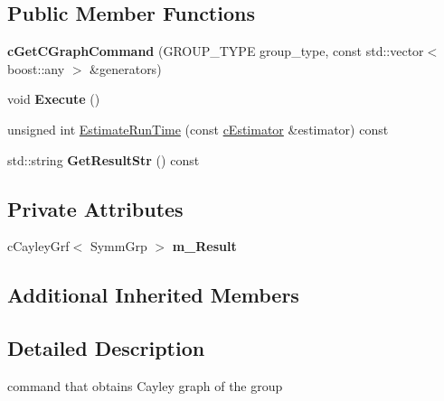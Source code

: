 \subsection*{Public Member Functions}
\begin{DoxyCompactItemize}
\item 
\hypertarget{classengine_1_1cGetCGraphCommand_a7fad17f3378da72ef8663f2587466bcc}{{\bfseries c\-Get\-C\-Graph\-Command} (G\-R\-O\-U\-P\-\_\-\-T\-Y\-P\-E group\-\_\-type, const std\-::vector$<$ boost\-::any $>$ \&generators)}\label{classengine_1_1cGetCGraphCommand_a7fad17f3378da72ef8663f2587466bcc}

\item 
\hypertarget{classengine_1_1cGetCGraphCommand_a94b83bc4b3103138411ec5bf1ccca84c}{void {\bfseries Execute} ()}\label{classengine_1_1cGetCGraphCommand_a94b83bc4b3103138411ec5bf1ccca84c}

\item 
unsigned int \hyperlink{classengine_1_1cGetCGraphCommand_a0a3d07c4f82227b7f0ffbcf01f7fcec2}{Estimate\-Run\-Time} (const \hyperlink{classengine_1_1cEstimator}{c\-Estimator} \&estimator) const 
\item 
\hypertarget{classengine_1_1cGetCGraphCommand_a623f8e7a207e148a8b026f0980920626}{std\-::string {\bfseries Get\-Result\-Str} () const }\label{classengine_1_1cGetCGraphCommand_a623f8e7a207e148a8b026f0980920626}

\end{DoxyCompactItemize}
\subsection*{Private Attributes}
\begin{DoxyCompactItemize}
\item 
\hypertarget{classengine_1_1cGetCGraphCommand_ab815ffa24d00a0c326068b7f41ca28c1}{c\-Cayley\-Grf$<$ Symm\-Grp $>$ {\bfseries m\-\_\-\-Result}}\label{classengine_1_1cGetCGraphCommand_ab815ffa24d00a0c326068b7f41ca28c1}

\end{DoxyCompactItemize}
\subsection*{Additional Inherited Members}


\subsection{Detailed Description}
command that obtains Cayley graph of the group 

